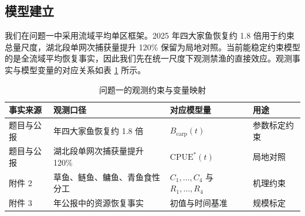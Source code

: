 \subsection{模型建立}
我们在问题一中采用流域平均单区框架。2025 年四大家鱼恢复约 1.8 倍用于约束总量尺度，湖北段单网次捕获量提升 120\% 保留为局地对照。当前能稳定约束模型的是全流域平均恢复事实，因此我们先在统一尺度下观测禁渔的直接效应。观测事实与模型变量的对应关系如表 \ref{tab:q1_anchor} 所示。
\begin{table}[htbp]
\centering
\caption{问题一的观测约束与变量映射}
\label{tab:q1_anchor}
\begin{tabularx}{0.95\textwidth}{>{\raggedright\arraybackslash}p{2.2cm} >{\raggedright\arraybackslash}p{3.2cm} >{\raggedright\arraybackslash}p{3.2cm} >{\raggedright\arraybackslash}X}
\toprule
事实来源 & 观测口径 & 对应模型量 & 用途 \\
\midrule
题目与公报 & 2025 年四大家鱼恢复约 1.8 倍 & $B_{\text{carp}}(t)$ & 参数标定约束 \\
题目与公报 & 湖北段单网次捕获量提升 120\% & $\mathrm{CPUE}^*(t)$ & 局地对照 \\
附件 2 & 草鱼、鲢鱼、鳙鱼、青鱼食性分工 & $C_1,\dots,C_4$ 与 $R_1,\dots,R_4$ & 机理约束 \\
附件 3 & 2022 年公报中的资源恢复事实 & 初值与时间基准 & 规模标定 \\
\bottomrule
\end{tabularx}
\end{table}

